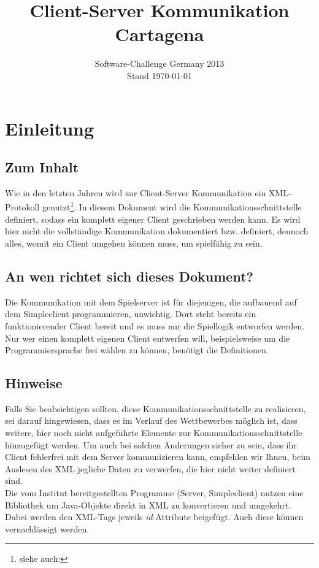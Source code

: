 \documentclass[12pt,a4paper, ngerman, oneside]{scrartcl}
\date{Software-Challenge Germany 2013\\Stand \today}
\title{Client-Server Kommunikation Cartagena}
\begin{document}
\maketitle
\thispagestyle{empty}
\tableofcontents
\thispagestyle{empty}
\newpage
\setcounter{page}{1}
\section{Einleitung}
\subsection*{Zum Inhalt}
Wie in den letzten Jahren wird zur Client-Server Kommunikation ein XML-Protokoll genutzt\footnote{siehe auch: }. In diesem Dokument wird die Kommunikationsschnittstelle definiert, sodass ein komplett eigener Client geschrieben werden kann. Es wird hier nicht die vollständige Kommunikation dokumentiert bzw. definiert, dennoch alles, womit ein Client umgehen können muss, um spielfähig zu sein.
\subsection*{An wen richtet sich dieses Dokument?}
Die Kommunikation mit dem Spielserver ist für diejenigen, die aufbauend auf dem Simpleclient programmieren, unwichtig. Dort steht bereits ein funktionierender Client bereit und es muss nur die Spiellogik entworfen werden. \\
Nur wer einen komplett eigenen Client entwerfen will, beispielsweise um die Programmiersprache frei wählen zu können, benötigt die Definitionen.

\subsection*{Hinweise} 
Falls Sie beabsichtigen sollten, diese Kommunikationsschnittstelle zu realisieren, sei darauf hingewiesen, dass es im Verlauf des Wettbewerbes möglich ist, dass weitere, hier noch nicht aufgeführte Elemente zur Kommunikationsschnittstelle hinzugefügt werden. Um auch bei solchen Änderungen sicher zu sein, dass ihr Client fehlerfrei mit dem Server kommunizieren kann, empfehlen wir Ihnen, beim Auslesen des XML jegliche Daten zu verwerfen, die hier nicht weiter definiert sind. \bigskip \\
Die vom Institut bereitgestellten Programme (Server, Simpleclient) nutzen eine Bibliothek um Java-Objekte direkt in XML zu konvertieren und umgekehrt. Dabei werden den XML-Tags jeweils \textit{id}-Attribute beigefügt. Auch diese können vernachlässigt werden.
\end{document}
